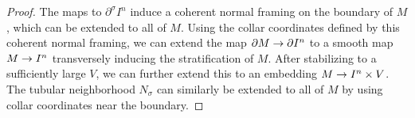 \documentclass[10pt,a4paper]{amsart}
\newcommand{\del}{\partial}
\renewcommand{\to}{\mathchoice{\longrightarrow}{\rightarrow}{}{}}
\begin{document}
\begin{proof}
	The maps to $\del^{\sigma}I^{n}$ induce a coherent normal framing on the boundary of $M$, which can be extended to all of $M$.
  Using the collar coordinates defined by this coherent normal framing, we can extend the map $\del M \to \del I^{n}$ to a smooth map $M\to I^{n}$ transversely inducing the stratification of $M$.
  After stabilizing to a sufficiently large $V$, we can further extend this to an embedding $M\to I^{n}\times V$.
  The tubular neighborhood $N_{\sigma}$ can similarly be extended to all of $M$ by using collar coordinates near the boundary.
\end{proof}
\end{document}
